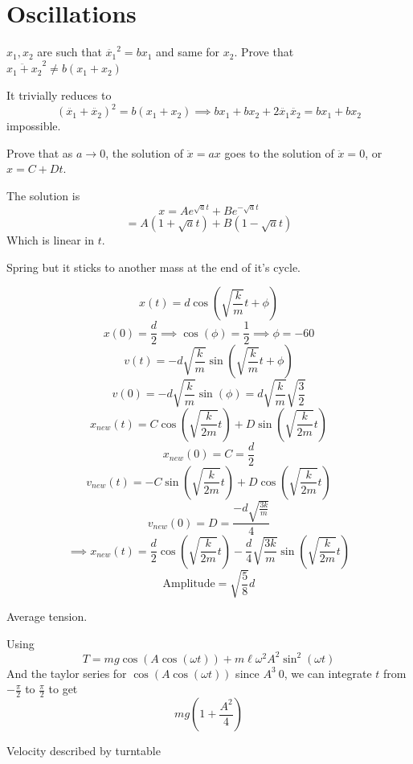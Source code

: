 \documentclass[11pt]{scrartcl}
\newcommand{\ca}[1]{\mathrm{#1}}
\begin{document}
\section{Oscillations}
\begin{example}
  [4.1]
  $x_1,x_2$ are such that $\ddot{x_1}^2=bx_1$ and same for $x_2$. Prove that $\ddot{x_1+x_2}^2\ne b(x_1+x_2)$
\end{example}
\begin{soln}
  It trivially reduces to $$(\ddot{x_1}+\ddot{x_2})^2=b(x_1+x_2)\implies bx_1+bx_2+2\ddot{x_1}\ddot{x_2}=bx_1+bx_2$$
  impossible.
\end{soln}
\begin{example}
  [4.2]
  Prove that as $a\to 0$, the solution of $\ddot{x}=ax$ goes to the solution of $\ddot{x}=0$, or $x=C+Dt$.
\end{example}
\begin{soln}
  The solution is
  $$x=Ae^{\sqrt{a}t}+Be^{-\sqrt{a}t}$$
  $$=A(1+\sqrt{a}t)+B(1-\sqrt{a}t)$$
  Which is linear in $t$.
\end{soln}
\begin{example}
  [4.3]
  Spring but it sticks to another mass at the end of it's cycle.
\end{example}
\begin{soln}
  $$x(t)=d\cos(\sqrt{\frac{k}{m}}t+\phi)$$
  $$x(0)=\frac{d}{2}\implies \cos(\phi)=\frac12\implies \phi=-60$$
  $$v(t)=-d\sqrt{\frac{k}{m}}\sin(\sqrt{\frac{k}{m}}t+\phi)$$
  $$v(0)=-d\sqrt{\frac{k}{m}}\sin(\phi)=d\sqrt{\frac{k}{m}}\sqrt{\frac32}$$
  $$x_{new}(t)=C\cos(\sqrt{\frac{k}{2m}}t)+D\sin(\sqrt{\frac{k}{2m}}t)$$
  $$x_{new}(0)=C=\frac{d}{2}$$
  $$v_{new}(t)=-C\sin(\sqrt{\frac{k}{2m}}t)+D\cos(\sqrt{\frac{k}{2m}}t)$$
  $$v_{new}(0)=D=\frac{-d\sqrt{\frac{3k}{m}}}{4}$$
  $$\implies x_{new}(t)=\frac{d}{2}\cos(\sqrt{\frac{k}{2m}}t)-\frac{d}{4}\sqrt{\frac{3k}{m}}\sin(\sqrt{\frac{k}{2m}}t)$$
  $$\ca{Amplitude}=\sqrt{\frac58}d$$
\end{soln}
\begin{example}
  [4.4]
  Average tension.
\end{example}
\begin{soln}
  Using
  $$T=mg\cos(A\cos(\omega t))+m\ell \omega^2 A^2\sin^2(\omega t)$$
  And the taylor series for $\cos(A\cos(\omega t))$ since $A^3~0$,
  we can integrate $t$ from $-\frac{\pi}{2}$ to $\frac{\pi}{2}$ to get
  $$mg\left(1+\frac{A^2}{4}\right)$$
\end{soln}
\begin{example}
  [4.5]
  Velocity described by turntable
\end{example}
\end{document}
